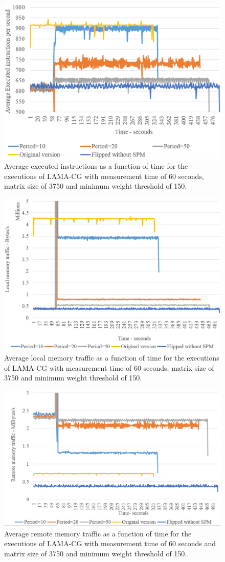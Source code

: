 \begin{figure}[th]
	\centering
		\includegraphics[width=.7\textwidth]{figures/lama-thrput.eps}
		\caption{Average executed instructions as a function of time for the executions of LAMA-CG with measurement time of 60 seconds, matrix size of 3750 and minimum weight threshold of 150.}
		\label{fig:res-lamatrg}
\end{figure}

\begin{figure}[t]
	\centering
		\includegraphics[width=.8\textwidth]{figures/lama-localtr.eps}
		\caption{Average local memory traffic as a function of time for the executions of LAMA-CG with measurement time of 60 seconds, matrix size of 3750 and minimum weight threshold of 150.}
		\label{fig:res-lamaloctr}
\end{figure}

\begin{figure}[t]
	\centering
		\includegraphics[width=.8\textwidth]{figures/lama-remotetr.eps}
		\caption{Average remote memory traffic as a function of time for the executions of LAMA-CG with measurement time of 60 seconds and matrix size of 3750 and minimum weight threshold of 150..}
		\label{fig:res-lamaremotr}
\end{figure}

